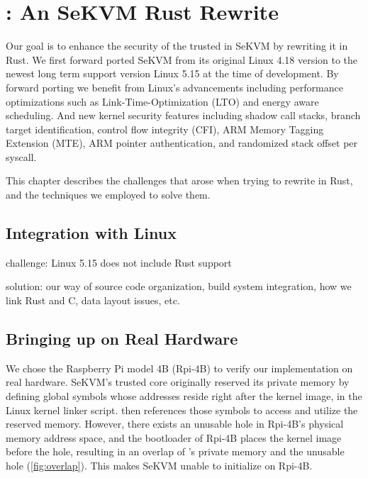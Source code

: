 \chapter{\rustsec{}: An SeKVM Rust Rewrite}
\label{sec:migration}


Our goal is to enhance the security of the trusted \secore{} in SeKVM by
rewriting it in Rust. We first forward ported SeKVM from its original
Linux 4.18 version to the newest long term support version Linux 5.15 at the
time of development.
By forward porting we benefit from Linux's advancements including performance
optimizations such as Link-Time-Optimization (LTO) and energy aware scheduling.
And new kernel security features including  shadow call stacks,
branch target identification, control flow integrity (CFI), ARM Memory Tagging
Extension (MTE), ARM pointer authentication, and randomized stack offset per
syscall.


This chapter describes the challenges that arose when trying to rewrite
\secore{} in Rust, and the techniques we employed to solve them.

\section{Integration with Linux}

challenge: Linux 5.15 does not include Rust support

solution: our way of source code organization, build system integration,
how we link Rust and C, data layout issues, etc.

\section{Bringing up \rustsec{} on Real Hardware}

We chose the Raspberry Pi model 4B (Rpi-4B) to verify our implementation on
real hardware.
SeKVM's trusted core \secore{} originally reserved its private memory by
defining global symbols whose addresses reside right after the kernel image,
in the Linux kernel linker script.
\secore{} then references those symbols to access and utilize the reserved
memory.
However, there exists an unusable hole in Rpi-4B's physical memory address
space, and the bootloader of Rpi-4B places the kernel image before the hole,
resulting in an overlap of \secore{}'s private memory and the unusable hole
(\autoref{fig:overlap}). This makes SeKVM unable to initialize on Rpi-4B.

